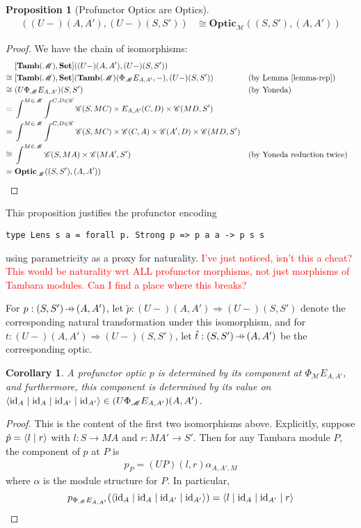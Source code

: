 \documentclass[11pt,letterpaper]{article}
\theoremstyle{plain}
\newtheorem{proposition}[theorem]{Proposition}
\newtheorem{corollary}[theorem]{Corollary}
\theoremstyle{definition}
\newcommand{\C}{\mathscr{C}}
\newcommand{\M}{\mathscr{M}}
\newcommand{\Pastro}{\Phi}
\newcommand{\Set}{\mathbf{Set}}
\newcommand{\Tamb}{\mathbf{Tamb}}
\newcommand{\Optic}{\mathbf{Optic}}
\newcommand{\id}{\mathrm{id}}
\newcommand{\rep}[2]{{\ensuremath \left\langle #1 \mid #2 \right\rangle}}
\newcommand{\repfour}[4]{{\ensuremath \langle #1 \mid #2 \mid #3 \mid #4 \rangle}}
\newcommand{\hto}{\ensuremath{\,\mathaccent\shortmid\rightarrow\,}}
\newcommand{\todo}[1]{\textcolor{red}{\small #1}}
\begin{document}
\begin{proposition}[Profunctor Optics are Optics]\label{prop:profunctor-optics-are-optics}
  \begin{align*}
    [\Tamb(\M), \Set]((U-)(A,A'),(U-)(S,S')) &\cong \Optic_\M((S, S'), (A, A'))
  \end{align*}
\end{proposition}
\begin{proof}
  We have the chain of isomorphisms:
  \begin{align*}
    &[\Tamb(\M), \Set]((U-)(A,A'),(U-)(S,S')) \\
    \cong \;&[\Tamb(\M), \Set](\Tamb(\M)(\Pastro_\M E_{A, A'}, -), (U-)(S,S'))  && \text{(by Lemma~\ref{lemma-rep})}\\
    \cong \;&(U\Pastro_\M E_{A, A'})(S,S')  && \text{(by Yoneda)} \\
    = \;&\int^{M \in \M} \int^{C,D \in \C} \C(S, MC) \times E_{A, A'}(C,D) \times \C(MD,S') \\
    = \;&\int^{M \in \M} \int^{C,D \in \C} \C(S, MC) \times \C(C,A) \times \C(A',D) \times \C(MD,S') \\
    \cong \;&\int^{M \in \M} \C(S, MA) \times \C(MA', S')  && \text{(by Yoneda reduction twice)} \\
    = \;&\Optic_\M((S, S'), (A, A'))
  \end{align*}
\end{proof}

  This proposition justifies the profunctor encoding
\begin{verbatim}
type Lens s a = forall p. Strong p => p a a -> p s s
\end{verbatim}
  using parametricity as a proxy for naturality.
  \todo{I've just noticed, isn't this a cheat? This would be naturality wrt ALL profunctor morphisms, not just morphisms of Tambara modules. Can I find a place where this breaks?}

For $p : (S, S') \hto (A, A')$, let $\tilde{p} : (U-)(A,A') \Rightarrow (U-)(S,S')$ denote the corresponding natural transformation under this isomorphism, and for $t : (U-)(A,A') \Rightarrow (U-)(S,S')$, let $\hat{t} : (S, S') \hto (A, A')$ be the corresponding optic.

\begin{corollary}
  A profunctor optic $p$ is determined by its component at $\Pastro_\M E_{A, A'}$, and furthermore, this component is determined by its value on $\repfour{\id_A}{\id_A}{\id_{A'}}{\id_{A'}} \in (U \Pastro_\M E_{A, A'})(A, A')$.
\end{corollary}
\begin{proof}
  This is the content of the first two isomorphisms above. Explicitly, suppose $\hat{p} = \rep{l}{r}$ with $l : S \to MA$ and $r : MA' \to S'$. Then for any Tambara module $P$, the component of $p$ at $P$ is
  \begin{align*}
    p_P = (UP)(l,r) \alpha_{A,A',M}
  \end{align*}
  where $\alpha$ is the module structure for $P$. In particular,
  \[
    p_{\Pastro_\M E_{A, A'}}(\repfour{\id_A}{\id_A}{\id_{A'}}{\id_{A'}}) = \repfour{l}{\id_A}{\id_{A'}}{r}
  \]
\end{proof}
\end{document}

